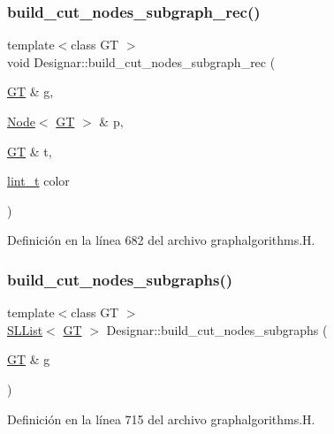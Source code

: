 \subsubsection{\texorpdfstring{build\+\_\+cut\+\_\+nodes\+\_\+subgraph\+\_\+rec()}{build\_cut\_nodes\_subgraph\_rec()}}
{\footnotesize\ttfamily template$<$class GT $>$ \\
void Designar\+::build\+\_\+cut\+\_\+nodes\+\_\+subgraph\+\_\+rec (\begin{DoxyParamCaption}\item[{\hyperlink{demo-buildgraph_8_c_a3001c40d2c31ca87ed96cd7d1334a55e}{GT} \&}]{g,  }\item[{\hyperlink{namespace_designar_a5af326c65aa2bd26b26c410f2030d09e}{Node}$<$ \hyperlink{demo-buildgraph_8_c_a3001c40d2c31ca87ed96cd7d1334a55e}{GT} $>$ \&}]{p,  }\item[{\hyperlink{demo-buildgraph_8_c_a3001c40d2c31ca87ed96cd7d1334a55e}{GT} \&}]{t,  }\item[{\hyperlink{namespace_designar_a9d113d66a39e82b73727c72cd3a52f73}{lint\+\_\+t}}]{color }\end{DoxyParamCaption})}



Definición en la línea 682 del archivo graphalgorithms.\+H.

\mbox{\label{namespace_designar_a8e15ec16859d46fd3c50bb9a295a1ea6}} 
\subsubsection{\texorpdfstring{build\+\_\+cut\+\_\+nodes\+\_\+subgraphs()}{build\_cut\_nodes\_subgraphs()}}
{\footnotesize\ttfamily template$<$class GT $>$ \\
\hyperlink{class_designar_1_1_s_l_list}{S\+L\+List}$<$ \hyperlink{demo-buildgraph_8_c_a3001c40d2c31ca87ed96cd7d1334a55e}{GT} $>$ Designar\+::build\+\_\+cut\+\_\+nodes\+\_\+subgraphs (\begin{DoxyParamCaption}\item[{\hyperlink{demo-buildgraph_8_c_a3001c40d2c31ca87ed96cd7d1334a55e}{GT} \&}]{g }\end{DoxyParamCaption})}



Definición en la línea 715 del archivo graphalgorithms.\+H.

